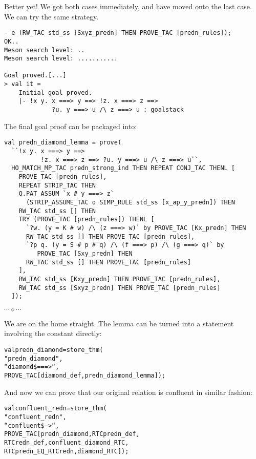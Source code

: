 \documentclass[12pt]{article}
\newcommand{\eos}{\hfill{}$\cdots\diamond\cdots$\hfill{}\vspace{5mm}}
\begin{document}
Better yet! We got both cases immediately, and have moved onto the
last case.  We can try the same strategy.
\begin{session}\begin{verbatim}
- e (RW_TAC std_ss [Sxyz_predn] THEN PROVE_TAC [predn_rules]);
OK..
Meson search level: ..
Meson search level: ...........

Goal proved.[...]
> val it =
    Initial goal proved.
    |- !x y. x ===> y ==> !z. x ===> z ==>
             ?u. y ===> u /\ z ===> u : goalstack
\end{verbatim}\end{session}
The final goal proof can be packaged into:
\begin{session}\begin{verbatim}
val predn_diamond_lemma = prove(
  ``!x y. x ===> y ==>
          !z. x ===> z ==> ?u. y ===> u /\ z ===> u``,
  HO_MATCH_MP_TAC predn_strong_ind THEN REPEAT CONJ_TAC THENL [
    PROVE_TAC [predn_rules],
    REPEAT STRIP_TAC THEN
    Q.PAT_ASSUM `x # y ===> z`
      (STRIP_ASSUME_TAC o SIMP_RULE std_ss [x_ap_y_predn]) THEN
    RW_TAC std_ss [] THEN
    TRY (PROVE_TAC [predn_rules]) THENL [
      `?w. (y = K # w) /\ (z ===> w)` by PROVE_TAC [Kx_predn] THEN
      RW_TAC std_ss [] THEN PROVE_TAC [predn_rules],
      `?p q. (y = S # p # q) /\ (f ===> p) /\ (g ===> q)` by
         PROVE_TAC [Sxy_predn] THEN
      RW_TAC std_ss [] THEN PROVE_TAC [predn_rules]
    ],
    RW_TAC std_ss [Kxy_predn] THEN PROVE_TAC [predn_rules],
    RW_TAC std_ss [Sxyz_predn] THEN PROVE_TAC [predn_rules]
  ]);
\end{verbatim}\end{session}
\eos{}

We are on the home straight.  The lemma can be turned into a statement
involving the  constant directly:
\begin{session}\begin{alltt}
val predn_diamond = store_thm(
  "predn_diamond",
  ``diamond \$===>``,
  PROVE_TAC [diamond_def, predn_diamond_lemma]);
\end{alltt}\end{session}

And now we can prove that our original relation is confluent in
similar fashion:

\begin{session}\begin{alltt}
val confluent_redn = store_thm(
  "confluent_redn",
  ``confluent \$-->``,
  PROVE_TAC [predn_diamond, RTCpredn_def,
             RTCredn_def, confluent_diamond_RTC,
             RTCpredn_EQ_RTCredn, diamond_RTC]);
\end{alltt}\end{session}
\end{document}
